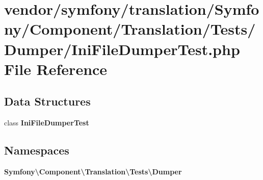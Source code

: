 \section{vendor/symfony/translation/\+Symfony/\+Component/\+Translation/\+Tests/\+Dumper/\+Ini\+File\+Dumper\+Test.php File Reference}
\label{_ini_file_dumper_test_8php}
\subsection*{Data Structures}
\begin{DoxyCompactItemize}
\item 
class {\bf Ini\+File\+Dumper\+Test}
\end{DoxyCompactItemize}
\subsection*{Namespaces}
\begin{DoxyCompactItemize}
\item 
 {\bf Symfony\textbackslash{}\+Component\textbackslash{}\+Translation\textbackslash{}\+Tests\textbackslash{}\+Dumper}
\end{DoxyCompactItemize}
